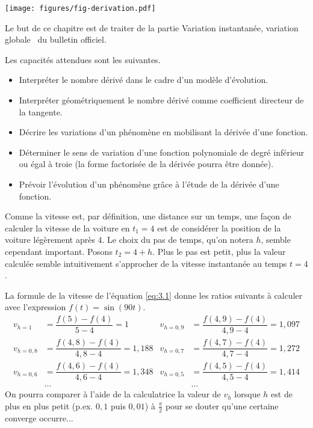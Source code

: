 \texttt{[image: figures/fig-derivation.pdf]}

Le but de ce chapitre est de traiter de la partie \og Variation instantanée, variation globale \fg~du bulletin officiel.

Les capacités attendues sont les suivantes.
\begin{itemize}
	\item Interpréter le nombre dérivé dans le cadre d'un modèle d'évolution.
	\item Interpréter géométriquement le nombre dérivé comme coefficient directeur de la tangente.
	\item Décrire les variations d'un phénomène en mobilisant la dérivée d'une fonction.
	\item Déterminer le sens de variation d'une fonction polynomiale de degré inférieur ou égal à troie (la forme factorisée de la dérivée pourra être donnée).
	\item Prévoir l'évolution d'un phénomène grâce à l'étude de la dérivée d'une fonction.
\end{itemize}

Comme la vitesse est, par définition, une distance sur un temps, une façon de calculer la vitesse de la voiture en $t_1=4$ est de considérer la position de la voiture légèrement après $4$.
Le choix du pas de temps, qu'on notera $h$, semble cependant important. Posons $t_2 = 4+h$.
Plus le pas est petit, plus la valeur calculée semble intuitivement s'approcher de la vitesse instantanée au temps $t=4$.

La formule de la vitesse de l'équation \eqref{eq:3.1} donne les ratios suivants à calculer avec l'expression $f(t) = \sin(90t)$.
\begin{align*}
	v_{h=1} &= \dfrac{f(5) - f(4)}{5-4} = 1 & v_{h=0,9} &=  \dfrac{f(4,9) - f(4)}{4,9-4} = 1,097 \\
	v_{h=0,8} &=  \dfrac{f(4,8) - f(4)}{4,8-4} = 1,188 & v_{h=0,7} &=  \dfrac{f(4,7) - f(4)}{4,7-4} = 1,272 \\
	v_{h=0,6} &=  \dfrac{f(4,6) - f(4)}{4,6-4} = 1,348 & v_{h=0,5} &=  \dfrac{f(4,5) - f(4)}{4,5-4} = 1,414 \\
	&\dots & &\dots
\end{align*}
On pourra comparer à l'aide de la calculatrice la valeur de $v_{h}$ lorsque $h$ est de plus en plus petit (p.ex. $0,1$ puis $0,01$) à $\frac\pi2$ pour se douter qu'une certaine converge occurre...


